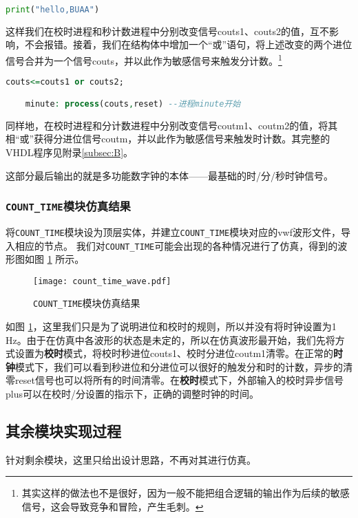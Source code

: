 \documentclass[12pt,AutoFakeBold]{article}
\begin{document}
\begin{lstlisting}[language=python]
print("hello,BUAA")
\end{lstlisting}

这样我们在校时进程和秒计数进程中分别改变信号\textsf{couts1、couts2}的值，互不影响，不会报错。接着，我们在结构体中增加一个“或”语句，将上述改变的两个进位信号合并为一个信号\textsf{couts}，并以此作为敏感信号来触发分计数。\footnote{其实这样的做法也不是很好，因为一般不能把组合逻辑的输出作为后续的敏感信号，这会导致竞争和冒险，产生毛刺。}
\begin{lstlisting}[language=vhdl,numbers=none]
    couts<=couts1 or couts2;

    minute: process(couts,reset) --进程minute开始
    \end{lstlisting}

同样地，在校时进程和分计数进程中分别改变信号\textsf{coutm1、coutm2}的值，将其相“或”获得分进位信号\textsf{coutm}，并以此作为敏感信号来触发时计数。其完整的VHDL程序见附录\ref{subsec:B}。

这部分最后输出的就是多功能数字钟的本体——最基础的时/分/秒时钟信号。

\subsubsection{\texttt{COUNT\_TIME}模块仿真结果}
将\texttt{COUNT\_TIME}模块设为顶层实体，并建立\texttt{COUNT\_TIME}模块对应的vwf波形文件，导入相应的节点。
我们对\texttt{COUNT\_TIME}可能会出现的各种情况进行了仿真，得到的波形图如图 \ref{fig:count_time_wave} 所示。
\begin{figure}[htbp]
    \centering
    \texttt{[image: count\_time\_wave.pdf]} 	%
    \caption{\texttt{COUNT\_TIME}模块仿真结果}		%
    \label{fig:count_time_wave}							%
\end{figure}

如图 \ref{fig:count_time_wave}，这里我们只是为了说明进位和校时的规则，所以并没有将时钟设置为1 Hz。由于在仿真中各波形的状态是未定的，所以在仿真波形最开始，我们先将方式设置为\textsf{\textbf{校时}}模式，将校时秒进位\textsf{couts1}、校时分进位\textsf{coutm1}清零。在正常的\textsf{\textbf{时钟}}模式下，我们可以看到秒进位和分进位可以很好的触发分和时的计数，异步的清零\textsf{reset}信号也可以将所有的时间清零。在\textsf{\textbf{校时}}模式下，外部输入的校时异步信号\textsf{plus}可以在校时/分设置的指示下，正确的调整时钟的时间。

\subsection{其余模块实现过程}\label{subsec:others}
针对剩余模块，这里只给出设计思路，不再对其进行仿真。
\end{document}
